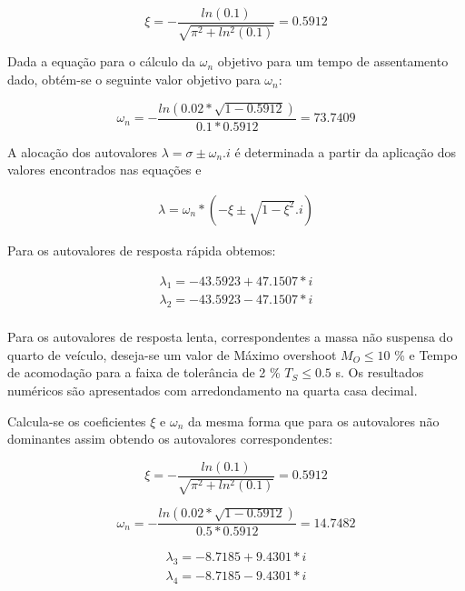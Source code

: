 \begin{equation*}
    \xi=-\frac{ln\left(0.1\right)}{\sqrt{\pi^2+ln^2(0.1)}}=0.5912
\end{equation*}

Dada a equação   para o cálculo da $\omega_n$ objetivo para um tempo de assentamento dado, obtém-se o seguinte valor objetivo para $\omega_n$:

\begin{equation*}
    \omega_n=-\frac{ln\left( 0.02*\sqrt{1-0.5912} \right)}{0.1*0.5912}=73.7409
\end{equation*}

A alocação dos autovalores $\lambda = \sigma \pm \omega_n.i$ é determinada a partir da aplicação dos valores encontrados nas equações   e 

\begin{align} \label{eq:autovalores_de_xi}
     \lambda = \omega_n * (-\xi \pm \sqrt{1-\xi^2}.i)
\end{align}

Para os autovalores de resposta rápida obtemos:

\begin{align*} \label{eq:autovalores_nao_dominantes}
     \lambda_1 = -43.5923 + 47.1507*i\\
     \lambda_2 = -43.5923 - 47.1507*i\\
\end{align*}

Para os autovalores de resposta lenta, correspondentes a massa não suspensa do quarto de veículo, deseja-se um valor de Máximo overshoot $M_O \leq 10$ \% e Tempo de acomodação para a faixa de tolerância de 2 \% $T_S \leq 0.5$ s. Os resultados numéricos são apresentados com arredondamento na quarta casa decimal.

Calcula-se os coeficientes $\xi$ e $\omega_n$ da mesma forma que para os autovalores não dominantes assim obtendo os autovalores correspondentes:

\begin{equation*}
    \xi=-\frac{ln\left(0.1\right)}{\sqrt{\pi^2+ln^2(0.1)}}=0.5912
\end{equation*}

\begin{equation*}
    \omega_n=-\frac{ln\left( 0.02*\sqrt{1-0.5912} \right)}{0.5*0.5912}=14.7482
\end{equation*}

\begin{align*} \label{eq:autovalores_dominantes}
     \lambda_3 = -8.7185 + 9.4301*i\\
     \lambda_4 = -8.7185 - 9.4301*i\\
\end{align*}

